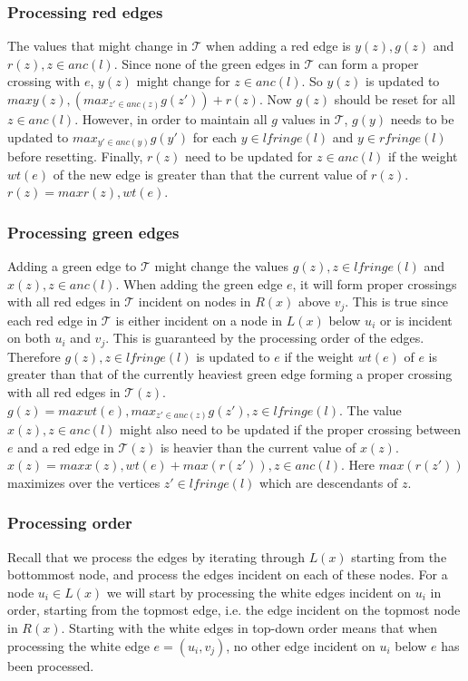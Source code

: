 \subsubsection{Processing red edges}
The values that might change in $\mathcal{T}$ when adding a red edge is $y(z), g(z)$ and $r(z), z \in anc(l)$. Since none of the green edges in $\mathcal{T}$ can form a proper crossing with $e$, $y(z)$ might change for $z \in anc(l)$. So $y(z)$ is updated to $max{y(z), (max_{z' \in anc(z)} g(z')) + r(z)}$. Now $g(z)$ should be reset for all $z \in anc(l)$. However, in order to maintain all $g$ values in $\mathcal{T}$, $g(y)$ needs to be updated to $max_{y' \in anc(y)} g(y')$ for each $y \in lfringe(l)$ and $y \in rfringe(l)$ before resetting. Finally, $r(z)$ need to be updated for $z \in anc(l)$ if the weight $wt(e)$ of the new edge is greater than that the current value of $r(z)$. $r(z)=max{r(z), wt(e)}$.

\subsubsection{Processing green edges}
Adding a green edge to $\mathcal{T}$ might change the values $g(z), z \in lfringe(l)$ and $x(z), z \in anc(l)$. When adding the green edge $e$, it will form proper crossings with all red edges in $\mathcal{T}$ incident on nodes in $R(x)$ above $v_j$. This is true since each red edge in $\mathcal{T}$ is either incident on a node in $L(x)$ below $u_i$ or is incident on both $u_i$ and $v_j$. This is guaranteed by the processing order of the edges. Therefore $g(z), z \in lfringe(l)$ is updated to $e$ if the weight $wt(e)$ of $e$ is greater than that of the currently heaviest green edge forming a proper crossing with all red edges in $\mathcal{T}(z)$. $g(z)=max{wt(e), max_{z' \in anc(z)} g(z')}, z \in lfringe(l)$. The value $x(z), z \in anc(l)$ might also need to be updated if the proper crossing between $e$ and a red edge in $\mathcal{T}(z)$ is heavier than the current value of $x(z)$. $x(z)=max{x(z), wt(e) + max(r(z'))}, z \in anc(l)$. Here $max(r(z'))$ maximizes over the vertices $z' \in lfringe(l)$ which are descendants of $z$.

\subsubsection{Processing order}
Recall that we process the edges by iterating through $L(x)$ starting from the bottommost node, and process the edges incident on each of these nodes. For a node $u_i \in L(x)$ we will start by processing the white edges incident on $u_i$ in order, starting from the topmost edge, i.e. the edge incident on the topmost node in $R(x)$. Starting with the white edges in top-down order means that when processing the white edge $e=(u_i,v_j)$, no other edge incident on $u_i$ below $e$ has been processed.

